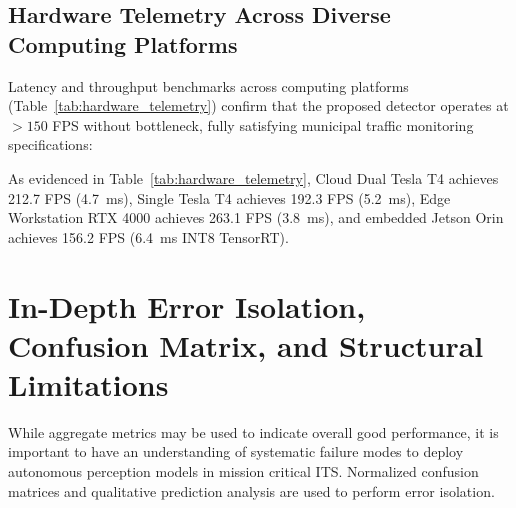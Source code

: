 \documentclass[pdflatex,sn-mathphys]{sn-jnl}
\begin{document}
\subsection{Hardware Telemetry Across Diverse Computing Platforms}
Latency and throughput benchmarks across computing platforms (Table~\ref{tab:hardware_telemetry}) confirm that the proposed detector operates at $>150$ FPS without bottleneck, fully satisfying municipal traffic monitoring specifications:

\begin{table}[t]
\caption{Cross-Platform Hardware Execution Telemetry for Proposed YOLOv11m + CBAM}\label{tab:hardware_telemetry}
\end{table}

As evidenced in Table~\ref{tab:hardware_telemetry}, Cloud Dual Tesla T4 achieves 212.7 FPS (4.7~ms), Single Tesla T4 achieves 192.3 FPS (5.2~ms), Edge Workstation RTX 4000 achieves 263.1 FPS (3.8~ms), and embedded Jetson Orin achieves 156.2 FPS (6.4~ms INT8 TensorRT).

\section{In-Depth Error Isolation, Confusion Matrix, and Structural Limitations}\label{sec:error}

While aggregate metrics may be used to indicate overall good performance, it is important to have an understanding of systematic failure modes to deploy autonomous perception models in mission critical ITS. Normalized confusion matrices and qualitative prediction analysis are used to perform error isolation.
\end{document}
